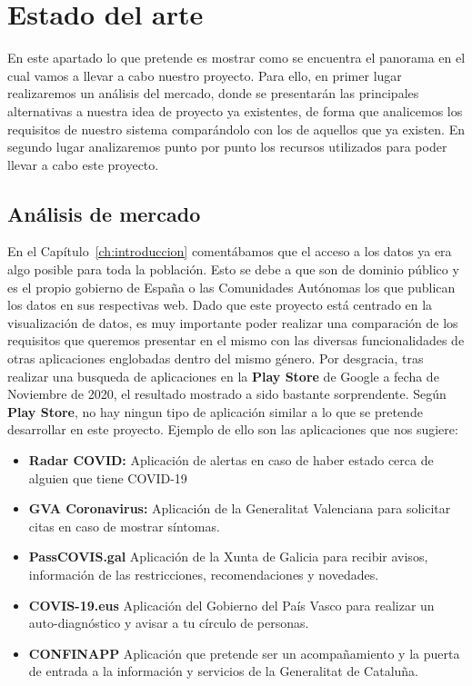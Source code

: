 \chapter{Estado del arte} \label{ch:estado_del_arte}

En este apartado lo que pretende es mostrar como se encuentra el panorama en el cual vamos a llevar a cabo nuestro proyecto. Para ello, en primer lugar realizaremos un análisis del mercado, donde se presentarán las principales alternativas a nuestra idea de proyecto ya existentes, de forma que analicemos los requisitos de nuestro sistema comparándolo con los de aquellos que ya existen. En segundo lugar analizaremos punto por punto los recursos utilizados para poder llevar a cabo este proyecto.

\section{Análisis de mercado}

En el Capítulo~\ref{ch:introduccion} comentábamos que el acceso a los datos ya era algo posible para toda la población. Esto se debe a que son de dominio público y es el propio gobierno de España o las Comunidades Autónomas los que publican los datos en sus respectivas web. Dado que este proyecto está centrado en la visualización de datos, es muy importante poder realizar una comparación de los requisitos que queremos presentar en el mismo con las diversas funcionalidades de otras aplicaciones englobadas dentro del mismo género. Por desgracia, tras realizar una busqueda de aplicaciones en la \textbf{Play Store} de Google a fecha de Noviembre de 2020, el resultado mostrado a sido bastante sorprendente. Según \textbf{Play Store}, no hay ningun tipo de aplicación similar a lo que se pretende desarrollar en este proyecto. Ejemplo de ello son las aplicaciones que nos sugiere:

\begin{itemize}
	\item \textbf{Radar COVID:} Aplicación de alertas en caso de haber estado cerca de alguien que tiene COVID-19
	\item \textbf{GVA Coronavirus:} Aplicación de la Generalitat Valenciana para solicitar citas en caso de mostrar síntomas.
	\item \textbf{PassCOVIS.gal} Aplicación de la Xunta de Galicia para recibir avisos, información de las restricciones, recomendaciones y novedades.
	\item \textbf{COVIS-19.eus} Aplicación del Gobierno del País Vasco para realizar un auto-diagnóstico y avisar a tu círculo de personas.
	\item \textbf{CONFINAPP} Aplicación que pretende ser un acompañamiento y la puerta de entrada a la información y servicios de la Generalitat de Cataluña.
\end{itemize}


